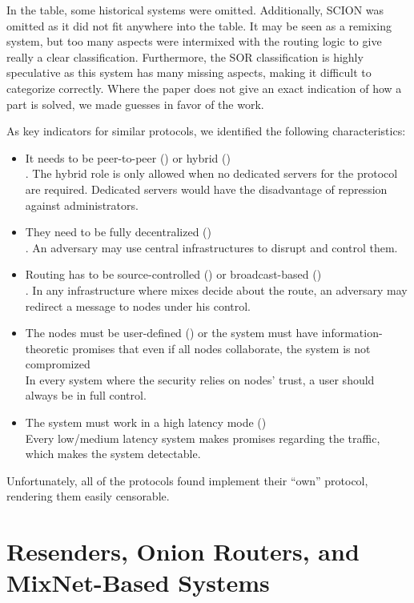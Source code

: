 In the table, some historical systems were omitted. Additionally, SCION was omitted as it did not fit anywhere into the table. It may be seen as a remixing system, but too many aspects were intermixed with the routing logic to give really a clear classification. Furthermore, the SOR classification is highly speculative as this system has many missing aspects, making it difficult to categorize correctly. Where the paper does not give an exact indication of how a part is solved, we made guesses in favor of the work.

As key indicators for similar protocols, we identified the following characteristics:
\begin{itemize}
	\item It needs to be peer-to-peer (\rolePtp) or hybrid (\roleHybrid)\\.
	The hybrid role is only allowed when no dedicated servers for the protocol are required. Dedicated servers would have the disadvantage of repression against administrators.
	\item They need to be fully decentralized (\decentralizationDecentr)\\.
	An adversary may use central infrastructures to disrupt and control them.
	\item Routing has to be source-controlled (\routingRoutesrc) or broadcast-based (\routingRoutebc)\\.
	In any infrastructure where mixes decide about the route, an adversary may redirect a message to nodes under his control.
	\item The nodes must be user-defined (\nsnodesusr) or the system must have information-theoretic promises that even if all nodes collaborate, the system is not compromized\\
	In every system where the security relies on nodes' trust, a user should always be in full control.
	\item The system must work in a high latency mode (\perflath)\\
	Every low/medium latency system makes promises regarding the traffic, which makes the system detectable.
\end{itemize}

Unfortunately, all of the protocols found implement their ``own'' protocol, rendering them easily censorable. 

\section{Resenders, Onion Routers, and MixNet-Based Systems}\label{sec:remailersAndMixnets}
